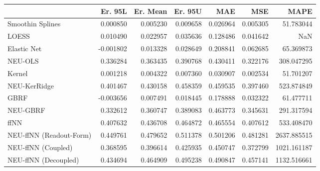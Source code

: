 \begin{tabular}{lrrrrrr}
\toprule
{} &   Er. 95L &  Er. Mean &   Er. 95U &       MAE &       MSE &         MAPE \\
\midrule
Smoothin Splines        &  0.000850 &  0.005230 &  0.009658 &  0.026964 &  0.005305 &    51.783044 \\
LOESS                   &  0.010490 &  0.022957 &  0.035636 &  0.128486 &  0.041642 &          NaN \\
Elastic Net             & -0.001802 &  0.013328 &  0.028649 &  0.208841 &  0.062685 &    65.369873 \\
NEU-OLS                 &  0.336284 &  0.363435 &  0.390768 &  0.430411 &  0.322176 &   308.047295 \\
Kernel                  &  0.001218 &  0.004322 &  0.007360 &  0.030907 &  0.002534 &    51.701207 \\
NEU-KerRidge            &  0.401467 &  0.430158 &  0.458359 &  0.459535 &  0.397460 &   523.874849 \\
GBRF                    & -0.003656 &  0.007491 &  0.018445 &  0.178888 &  0.032322 &    61.477711 \\
NEU-GBRF                &  0.332612 &  0.360747 &  0.389083 &  0.463773 &  0.345631 &   291.317594 \\
ffNN                    &  0.407632 &  0.436708 &  0.464872 &  0.465554 &  0.407612 &   533.408470 \\
NEU-ffNN (Readout-Form) &  0.449761 &  0.479652 &  0.511378 &  0.501206 &  0.481281 &  2637.885515 \\
NEU-ffNN (Coupled)      &  0.368595 &  0.396614 &  0.425935 &  0.450747 &  0.372799 &  1021.161187 \\
NEU-ffNN (Decoupled)    &  0.434694 &  0.464909 &  0.495238 &  0.490847 &  0.457141 &  1132.516661 \\
\bottomrule
\end{tabular}
